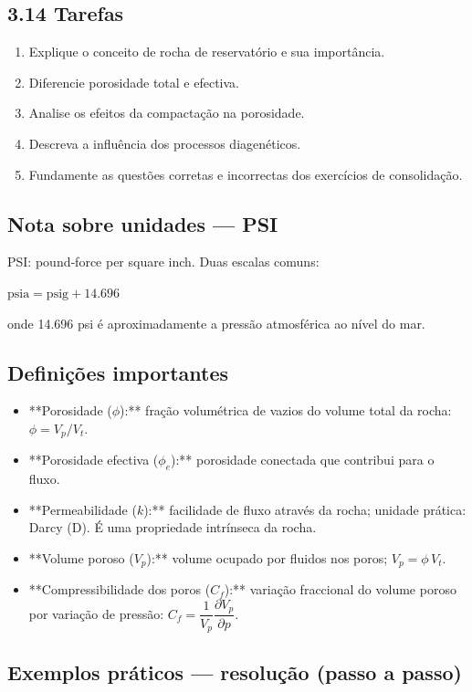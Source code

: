 \documentclass[11pt,a4paper]{article}
\begin{document}
\subsection{3.14 Tarefas}
\begin{enumerate}
\item Explique o conceito de rocha de reservatório e sua importância.
\item Diferencie porosidade total e efectiva.
\item Analise os efeitos da compactação na porosidade.
\item Descreva a influência dos processos diagenéticos.
\item Fundamente as questões corretas e incorrectas dos exercícios de consolidação.
\end{enumerate}

\subsection{Nota sobre unidades — PSI}
PSI: pound‑force per square inch. Duas escalas comuns:

$\text{psia} = \text{psig} + 14.696$

onde 14.696 psi é aproximadamente a pressão atmosférica ao nível do mar.

\subsection{Definições importantes}
\begin{itemize}
\item **Porosidade ($\phi$):** fração volumétrica de vazios do volume total da rocha: $\phi = V_p / V_t$.
\item **Porosidade efectiva ($\phi_e$):** porosidade conectada que contribui para o fluxo.
\item **Permeabilidade ($k$):** facilidade de fluxo através da rocha; unidade prática: Darcy (D). É uma propriedade intrínseca da rocha.
\item **Volume poroso ($V_p$):** volume ocupado por fluidos nos poros; $V_p=\phi\,V_t$.
\item **Compressibilidade dos poros ($C_f$):** variação fraccional do volume poroso por variação de pressão: $C_f=\dfrac{1}{V_p}\dfrac{\partial V_p}{\partial p}$.
\end{itemize}

\subsection{Exemplos práticos — resolução (passo a passo)}
\end{document}
